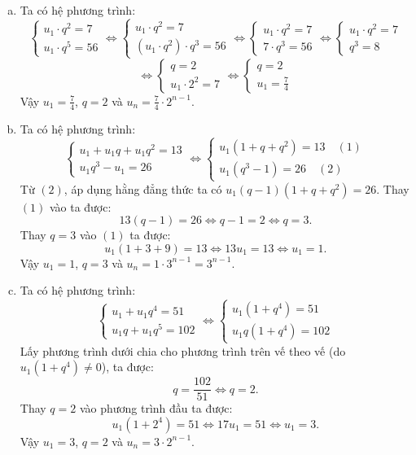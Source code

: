 \begin{vd}
{\begin{enumerate}[a)]
			\item Ta có hệ phương trình:
			$$ \begin{cases} u_1 \cdot q^2 = 7 \\ u_1 \cdot q^5 = 56 \end{cases} \Leftrightarrow \begin{cases} u_1 \cdot q^2 = 7 \\ (u_1 \cdot q^2) \cdot q^3 = 56 \end{cases} \Leftrightarrow \begin{cases} u_1 \cdot q^2 = 7 \\ 7 \cdot q^3 = 56 \end{cases} \Leftrightarrow \begin{cases} u_1 \cdot q^2 = 7 \\ q^3 = 8 \end{cases} $$
			$$ \Leftrightarrow \begin{cases} q = 2 \\ u_1 \cdot 2^2 = 7 \end{cases} \Leftrightarrow \begin{cases} q = 2 \\ u_1 = \frac{7}{4} \end{cases} $$
			Vậy $u_1 = \frac{7}{4}$, $q = 2$ và $u_n = \frac{7}{4} \cdot 2^{n-1}$.
			
			\item Ta có hệ phương trình:
			$$ \begin{cases} u_1 + u_1q + u_1q^2 = 13 \\ u_1q^3 - u_1 = 26 \end{cases} \Leftrightarrow \begin{cases} u_1(1 + q + q^2) = 13 \quad (1) \\ u_1(q^3 - 1) = 26 \quad (2) \end{cases} $$
			Từ $(2)$, áp dụng hằng đẳng thức ta có $u_1(q - 1)(1 + q + q^2) = 26$. Thay $(1)$ vào ta được:
			$$ 13(q - 1) = 26 \Leftrightarrow q - 1 = 2 \Leftrightarrow q = 3. $$
			Thay $q = 3$ vào $(1)$ ta được: 
			$$ u_1(1 + 3 + 9) = 13 \Leftrightarrow 13u_1 = 13 \Leftrightarrow u_1 = 1. $$
			Vậy $u_1 = 1$, $q = 3$ và $u_n = 1 \cdot 3^{n-1} = 3^{n-1}$.
			
			\item Ta có hệ phương trình:
			$$ \begin{cases} u_1 + u_1q^4 = 51 \\ u_1q + u_1q^5 = 102 \end{cases} \Leftrightarrow \begin{cases} u_1(1 + q^4) = 51 \\ u_1q(1 + q^4) = 102 \end{cases} $$
			Lấy phương trình dưới chia cho phương trình trên vế theo vế (do $u_1(1+q^4) \neq 0$), ta được:
			$$ q = \frac{102}{51} \Leftrightarrow q = 2. $$
			Thay $q = 2$ vào phương trình đầu ta được:
			$$ u_1(1 + 2^4) = 51 \Leftrightarrow 17u_1 = 51 \Leftrightarrow u_1 = 3. $$
			Vậy $u_1 = 3$, $q = 2$ và $u_n = 3 \cdot 2^{n-1}$.
			

\end{enumerate}}
\end{vd}
